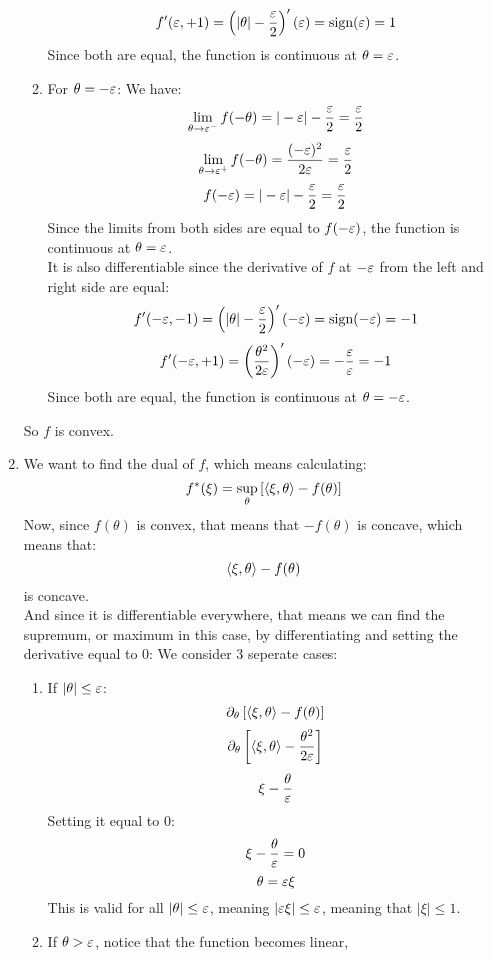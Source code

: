 \documentclass[12pt]{article}
\begin{document}
\begin{enumerate}[label = \letters]
\begin{enumerate}[label = \numbers]
        \[ f'(\varepsilon, +1) = \left( |\theta| - 
        \dfrac{\varepsilon}{2} \right)'(\varepsilon) = \text{sign}(\varepsilon) = 1 \]
        Since both are equal,
        the function is continuous
        at $\theta = \varepsilon$.
        \item For $\theta = -\varepsilon$:
        We have:
        \[ \lim_{\theta \to \varepsilon^-} f(-\theta)
        = |-\varepsilon| - \dfrac{\varepsilon}{2} = \dfrac{\varepsilon}{2} \]
        \[ \lim_{\theta \to \varepsilon^+} f(-\theta)
        = \dfrac{(-\varepsilon)^2}{2\varepsilon} = \dfrac{\varepsilon}{2} \]
        \[ f(-\varepsilon) = |-\varepsilon| - \dfrac{\varepsilon}{2} 
        = \dfrac{\varepsilon}{2} \]
        Since the limits from both sides are equal
        to $f(-\varepsilon)$, the function is continuous
        at $\theta = \varepsilon$. \\
        It is also differentiable since the
        derivative of $f$ at $-\varepsilon$ 
        from the left and right side are equal:
        \[ f'(-\varepsilon, -1) = \left( |\theta| - 
        \dfrac{\varepsilon}{2} \right)'(-\varepsilon) = \text{sign}(-\varepsilon) = -1 \]
        \[ f'(-\varepsilon, +1) = 
        \left( \dfrac{\theta^2}{2\varepsilon} \right)'(-\varepsilon)
        = -\dfrac{\varepsilon}{\varepsilon} = -1 \] 
        Since both are equal,
        the function is continuous
        at $\theta = -\varepsilon$.
    \end{enumerate}
    So $f$ is convex.
    \item 
    We want to find the dual of $f$,
    which means calculating:
    \[ f^*(\xi) = \sup_\theta 
    \left[  \left\langle \xi, \theta \right\rangle - f(\theta) \right] \]
    Now, since $f(\theta)$ is convex, that
    means that $-f(\theta)$ is concave,
    which means that:
    \[ \left\langle \xi, \theta \right\rangle - f(\theta) \]
    is concave. \\
    And since it is differentiable everywhere,
    that means we can find the supremum, or maximum
    in this case, by differentiating and setting the
    derivative equal to $0$:
    We consider $3$ seperate cases:
    \begin{enumerate}[label = \numbers]
        \item If $|\theta| \leq \varepsilon$:
        \[ \partial_\theta 
        \left[  \left\langle \xi, \theta \right\rangle - f(\theta) \right] \]
        \[ \partial_\theta \left[  \left\langle \xi, \theta \right\rangle 
        - \dfrac{\theta^2}{2\varepsilon} \right] \]
        \[ \xi - \dfrac{\theta}{\varepsilon} \]
        Setting it equal to $0$:
        \[ \xi - \dfrac{\theta}{\varepsilon} = 0 \]
        \[ \theta = \varepsilon \xi \]
        This is valid for all $|\theta| \leq \varepsilon$,
        meaning $|\varepsilon\xi| \leq \varepsilon$,
        meaning that $|\xi| \leq 1$.
        \item If $\theta > \varepsilon$,
        notice that the function becomes linear,

\end{enumerate}
\end{enumerate}
\end{document}
